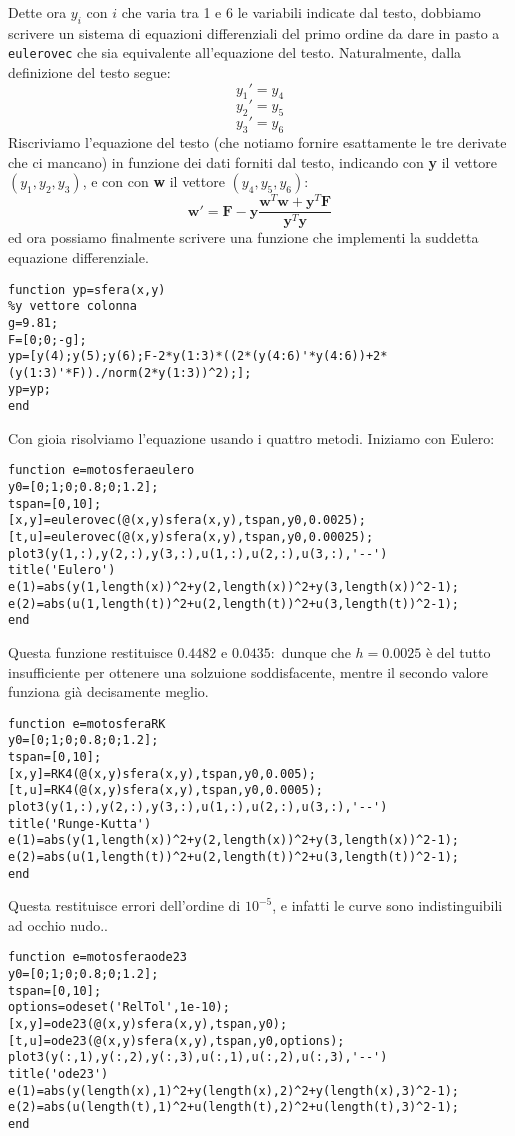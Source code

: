 \documentclass{article}
\begin{document}
\noindent
Dette ora $y_{i}$ con $i$ che varia tra 1 e 6 le variabili indicate dal testo, dobbiamo scrivere un sistema di equazioni differenziali del primo ordine da dare in pasto a \texttt{eulerovec} che sia equivalente all'equazione del testo.
Naturalmente, dalla definizione del testo segue:
$$y_{1}'=y_{4}$$
$$y_{2}'=y_{5}$$
$$y_{3}'=y_{6}$$
Riscriviamo l'equazione del testo (che notiamo fornire esattamente le tre derivate che ci mancano) in funzione dei dati forniti dal testo, indicando con \textbf{y} il vettore $(y_{1}, y_{2}, y_{3})$, e con con \textbf{w} il vettore $(y_{4}, y_{5}, y_{6})$:
$$\mathbf{w'}=\mathbf{F}- \mathbf{y} \frac{\mathbf{w}^{T}\mathbf{w}+\mathbf{y}^{T}\mathbf{F}}{\mathbf{y}^{T}\mathbf{y}}$$
\noindent
ed ora possiamo finalmente scrivere una funzione che implementi la suddetta equazione differenziale.
\begin{lstlisting}
function yp=sfera(x,y)
%y vettore colonna
g=9.81;
F=[0;0;-g];
yp=[y(4);y(5);y(6);F-2*y(1:3)*((2*(y(4:6)'*y(4:6))+2*(y(1:3)'*F))./norm(2*y(1:3))^2);];
yp=yp;
end
\end{lstlisting}
\noindent
Con gioia risolviamo l'equazione usando i quattro metodi. Iniziamo con Eulero:
\begin{lstlisting}
function e=motosferaeulero
y0=[0;1;0;0.8;0;1.2];
tspan=[0,10];
[x,y]=eulerovec(@(x,y)sfera(x,y),tspan,y0,0.0025);
[t,u]=eulerovec(@(x,y)sfera(x,y),tspan,y0,0.00025);
plot3(y(1,:),y(2,:),y(3,:),u(1,:),u(2,:),u(3,:),'--')
title('Eulero')
e(1)=abs(y(1,length(x))^2+y(2,length(x))^2+y(3,length(x))^2-1);
e(2)=abs(u(1,length(t))^2+u(2,length(t))^2+u(3,length(t))^2-1);
end
\end{lstlisting}
Questa funzione restituisce $0.4482$ e $0.0435:$ dunque che $h=0.0025$ \`{e} del tutto insufficiente per ottenere una solzuione soddisfacente, mentre il secondo valore funziona già decisamente meglio.
\begin{lstlisting}
function e=motosferaRK
y0=[0;1;0;0.8;0;1.2];
tspan=[0,10];
[x,y]=RK4(@(x,y)sfera(x,y),tspan,y0,0.005);
[t,u]=RK4(@(x,y)sfera(x,y),tspan,y0,0.0005);
plot3(y(1,:),y(2,:),y(3,:),u(1,:),u(2,:),u(3,:),'--')
title('Runge-Kutta')
e(1)=abs(y(1,length(x))^2+y(2,length(x))^2+y(3,length(x))^2-1);
e(2)=abs(u(1,length(t))^2+u(2,length(t))^2+u(3,length(t))^2-1);
end
\end{lstlisting}
Questa restituisce errori dell'ordine di $10^{-5}$, e infatti le curve sono indistinguibili ad occhio nudo..
\begin{lstlisting}
function e=motosferaode23
y0=[0;1;0;0.8;0;1.2];
tspan=[0,10];
options=odeset('RelTol',1e-10);
[x,y]=ode23(@(x,y)sfera(x,y),tspan,y0);
[t,u]=ode23(@(x,y)sfera(x,y),tspan,y0,options);
plot3(y(:,1),y(:,2),y(:,3),u(:,1),u(:,2),u(:,3),'--')
title('ode23')
e(1)=abs(y(length(x),1)^2+y(length(x),2)^2+y(length(x),3)^2-1);
e(2)=abs(u(length(t),1)^2+u(length(t),2)^2+u(length(t),3)^2-1);
end
\end{lstlisting}
\end{document}
